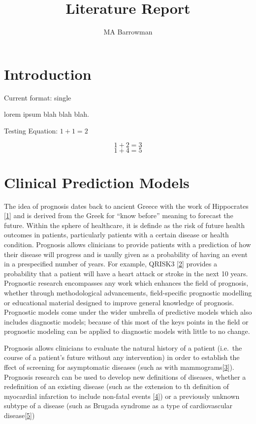 \documentclass[
]{article}
\title{Literature Report}
\author{MA Barrowman}
\date{}
\begin{document}
\maketitle

{
\setcounter{tocdepth}{2}
\tableofcontents
}
\hypertarget{introduction}{%
\section{Introduction}\label{introduction}}

Current format: single

lorem ipsum blah blah blah.

Testing Equation: \(1+1=2\)

\[
1 + 2 = 3
\]
\begin{equation}
1 + 4 = 5
\end{equation}
\hypertarget{clinical-prediction-models}{%
\section{Clinical Prediction Models}\label{clinical-prediction-models}}

The idea of prognosis dates back to ancient Greece with the work of Hippocrates {[}\protect\hyperlink{ref-hippocrates_genuine_1886}{1}{]} and is derived from the Greek for ``know before'' meaning to forecast the future. Within the sphere of healthcare, it is definde as the risk of future health outcomes in patients, particularly patients with a certain disease or health condition. Prognosis allows clinicians to provide patients with a prediction of how their disease will progress and is uaully given as a probability of having an event in a prespecified number of years. For example, QRISK3 {[}\protect\hyperlink{ref-hippisley-cox_development_2017}{2}{]} provides a probability that a patient will have a heart attack or stroke in the next 10 years. Prognostic research encompasses any work which enhances the field of prognosis, whether through methodological advancements, field-specific prognostic modelling or educational material designed to improve general knowledge of prognosis. Prognostic models come under the wider umbrella of predictive models which also includes diagnostic models; because of this most of the keys points in the field or prognostic modeling can be applied to diagnostic models with little to no change.

Prognosis allows clinicians to evaluate the natural history of a patient (i.e.~the course of a patient's future without any intervention) in order to establish the ffect of screening for asymptomatic diseases (such as with mammograms{[}\protect\hyperlink{ref-hemingway_prognosis_2013}{3}{]}). Prognosis research can be used to develop new definitions of diseases, whether a redefinition of an existing disease (such as the extension to th definition of myocardial infarction to include non-fatal events {[}\protect\hyperlink{ref-thygesen_universal_2007}{4}{]}) or a previously unknown subtype of a disease (such as Brugada syndrome as a type of cardiovascular disease{[}\protect\hyperlink{ref-probst_long-term_2010}{5}{]})
\end{document}
